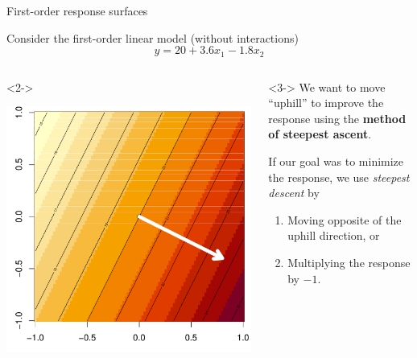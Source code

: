 \documentclass[10pt]{beamer}\usepackage[]{graphicx}\usepackage[]{color}
\newenvironment{knitrout}{}{} %
\begin{document}
\begin{frame}[fragile]{First-order response surfaces}

Consider the first-order linear model (without interactions)
\[ y = 20 + 3.6x_1 - 1.8x_2 \]

\begin{columns}

\begin{column}{0.5\textwidth}<2->
\begin{knitrout}
\color{fgcolor}

{\centering \includegraphics[width=\textwidth]{figure/unnamed-chunk-1-1} 

}


\end{knitrout}

\end{column}

\begin{column}{0.5\textwidth}<3->
We want to move ``uphill'' to improve the response using the \textbf{method of steepest ascent}.

\bigskip
If our goal was to minimize the response, we use \emph{steepest descent} by
\begin{enumerate}
  \item Moving opposite of the uphill direction, or
  \item Multiplying the response by $-1$.
\end{enumerate}
\end{column}

\end{columns}

\end{frame}
\end{document}
